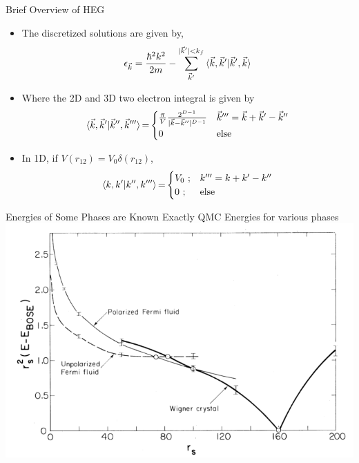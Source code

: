 \documentclass[10pt]{beamer}
\begin{document}
{{{{{{{{\begin{frame}{Brief Overview of HEG}
	\begin{itemize}[<+->]
		\item{The discretized solutions are given by,
		\begin{eqnarray}\label{eq:hf_orb_energy}
			\epsilon_{\vec{k}}=
				\frac{\hbar^2 k^2}{2m} - \sum\limits_{\vec{k}'}^{|\vec{k}'|< k_f}
				\braket{\vec{k}, \vec{k}' |\vec{k}', \vec{k}}
		\end{eqnarray}
		}
		\item{Where the 2D and 3D two electron integral is given by
  		\begin{equation}
  			\braket{\vec{k}, \vec{k}'|\vec{k}'',\vec{k}'''}{=}
  				\begin{cases}
  				\frac{\pi}{V}\frac{2^{D-1}}{|\vec{k}-\vec{k}''|^{D-1}}
  				& \vec{k}''' = \vec{k}+\vec{k}'-\vec{k}'' \nonumber\\
  				0
  				& \text{else}
  				\end{cases}
  		\end{equation}
		}
		\item{ In 1D, if $V(r_{12}) = V_0\delta{(r_{12})}$,
		  \begin{equation}
  			\braket{k, k'|k'',k'''}{=}
  				\begin{cases}
  				V_0\text{ ;}
  				& k''' = k+k'-k'' \\
  				0\text{ ;}
  				& \text{else}
  				\end{cases}
		  \end{equation}
		}
	\end{itemize}
\end{frame}

{%

\begin{frame}{Energies of Some Phases are Known Exactly}
  \centering
	QMC Energies for various phases
	\includegraphics[width=.85\linewidth]{../figures/Ceperley_PhaseDiag.png}
\end{frame}

}}}}}}}}}
\end{document}
